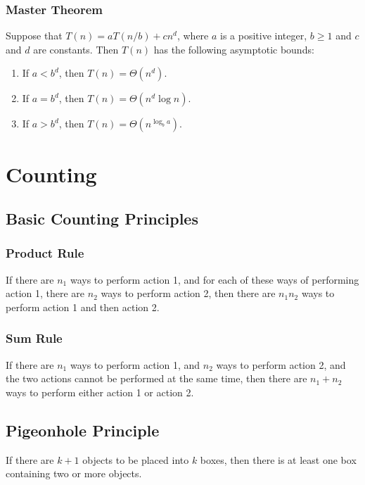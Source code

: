 \documentclass[a4paper,12pt]{article}
\begin{document}
\subsubsection{Master Theorem}

Suppose that $T(n) = aT(n/b) + c n^d$, where $a$ is a positive integer, $b \geq 1$ and $c$ and $d$ are constants.
Then $T(n)$ has the following asymptotic bounds:
\begin{enumerate}
	\item If $a < b^d$, then $T(n) = \Theta(n^d)$.
	\item If $a = b^d$, then $T(n) = \Theta(n^d \log n)$.
	\item If $a > b^d$, then $T(n) = \Theta(n^{\log_b a})$.
\end{enumerate}

\section{Counting}

\subsection{Basic Counting Principles}

\subsubsection{Product Rule}

If there are $n_1$ ways to perform action 1, and for each of these ways of performing action 1, there are $n_2$ ways to perform action 2, then there are $n_1 n_2$ ways to perform action 1 and then action 2.

\subsubsection{Sum Rule}

If there are $n_1$ ways to perform action 1, and $n_2$ ways to perform action 2, and the two actions cannot be performed at the same time, then there are $n_1 + n_2$ ways to perform either action 1 or action 2.

\subsection{Pigeonhole Principle}

If there are $k+1$ objects to be placed into $k$ boxes, then there is at least one box containing two or more objects.
\end{document}
